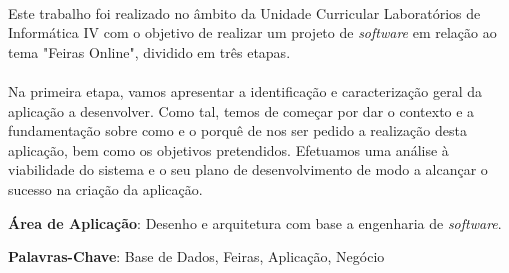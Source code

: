 \documentclass[a4paper,12pt]{scrreprt}
\begin{document}

\makecover



\clearpage
\begin{center}
    \thispagestyle{empty}
    \vspace*{\fill}
    
    
    
    \vspace*{\fill}
\end{center}
\clearpage






\renewenvironment{abstract}
 {\par\noindent\textbf{\Large\abstractname}\par\bigskip}
 {}

\begin{flushleft}
\begin{abstract}
    \paragraph{}
    Este trabalho foi realizado no âmbito da Unidade Curricular Laboratórios de Informática IV com o objetivo de realizar um projeto de \textit{software} em relação ao tema "Feiras Online", dividido em três etapas.
    \paragraph{}
    Na primeira etapa, vamos apresentar a identificação e caracterização geral da aplicação a desenvolver. Como tal, temos de começar por dar o contexto e a fundamentação sobre como e o porquê de nos ser pedido a realização desta aplicação, bem como os objetivos pretendidos. Efetuamos uma análise à viabilidade do sistema e o seu plano de desenvolvimento de modo a alcançar o sucesso na criação da aplicação. 

    \par \textbf{Área de Aplicação}: Desenho e arquitetura com base a engenharia de \textit{software}. 
    \par \textbf{Palavras-Chave}: Base de Dados, Feiras, Aplicação, Negócio
\end{abstract}
\end{flushleft}
\end{document}
